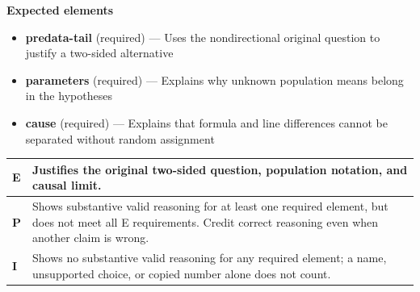 \documentclass[11pt]{article}
\begin{document}

\textbf{Expected elements}
\begin{itemize}[leftmargin=1.5em,itemsep=2pt,topsep=2pt]
  \item \textbf{predata-tail} (required) --- Uses the nondirectional original question to justify a two-sided alternative
  \item \textbf{parameters} (required) --- Explains why unknown population means belong in the hypotheses
  \item \textbf{cause} (required) --- Explains that formula and line differences cannot be separated without random assignment
\end{itemize}

{\small\renewcommand{\arraystretch}{1.25}
\noindent\begin{tabular}{|p{0.5in}|p{5.9in}|}
\hline
\textbf{E} & Justifies the original two-sided question, population notation, and causal limit. \\ \hline
\textbf{P} & Shows substantive valid reasoning for at least one required element, but does not meet all E requirements. Credit correct reasoning even when another claim is wrong. \\ \hline
\textbf{I} & Shows no substantive valid reasoning for any required element; a name, unsupported choice, or copied number alone does not count. \\ \hline
\end{tabular}}

\clearpage
{}
\end{document}
